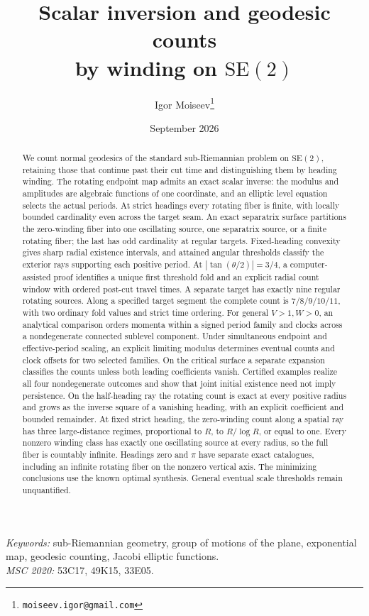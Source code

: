 \documentclass[11pt,a4paper]{article}
\title{Scalar inversion and geodesic counts\\by winding on $\mathrm{SE}(2)$}
\author{Igor Moiseev\thanks{\texttt{moiseev.igor@gmail.com}}}
\date{September 2026}
\theoremstyle{remark}\newtheorem{remark}[theorem]{Remark}
\begin{document}
\maketitle
\begin{abstract}
We count normal geodesics of the standard sub-Riemannian problem on
$\mathrm{SE}(2)$, retaining those that continue past their cut time and
distinguishing them by heading winding. The rotating endpoint map admits
an exact scalar inverse: the modulus and amplitudes are algebraic
functions of one coordinate, and an elliptic level equation selects the
actual periods. At strict headings every rotating fiber is finite, with
locally bounded cardinality even across the target seam.
An exact separatrix surface partitions the zero-winding fiber into one
oscillating source, one separatrix source, or a finite rotating fiber;
the last has odd cardinality at regular targets. Fixed-heading convexity
gives sharp radial existence intervals, and attained angular thresholds
classify the exterior rays supporting each positive period.
At $|\tan(\theta/2)|=3/4$, a computer-assisted proof identifies a unique
first threshold fold and an explicit radial count window with ordered
post-cut travel times. A separate target has exactly nine regular
rotating sources. Along a specified target segment the complete count
is $7/8/9/10/11$, with two ordinary fold values and strict time ordering.
For general $V>1,W>0$, an analytical comparison orders momenta within
a signed period family and clocks across a nondegenerate connected
sublevel component. Under simultaneous endpoint and effective-period
scaling, an explicit limiting modulus determines eventual counts and
clock offsets for two selected families. On the critical surface a
separate expansion classifies the counts unless both leading coefficients
vanish. Certified examples realize all four nondegenerate outcomes and
show that joint initial existence need not imply persistence.
On the half-heading ray the rotating count is exact at every positive
radius and grows as the inverse square of a vanishing heading, with an
explicit coefficient and bounded remainder. At fixed strict heading,
the zero-winding count along a spatial ray has three large-distance
regimes, proportional to $R$, to $R/\log R$, or equal to one. Every
nonzero winding class has exactly one oscillating source at every radius,
so the full fiber is countably infinite. Headings zero and $\pi$ have
separate exact catalogues, including an infinite rotating fiber on the
nonzero vertical axis. The minimizing conclusions use the known optimal
synthesis. General eventual scale thresholds remain unquantified.
\end{abstract}
\noindent\textit{Keywords:} sub-Riemannian geometry, group of motions of the
plane, exponential map, geodesic counting, Jacobi elliptic functions.\\
\textit{MSC 2020:} 53C17, 49K15, 33E05.
\end{document}
